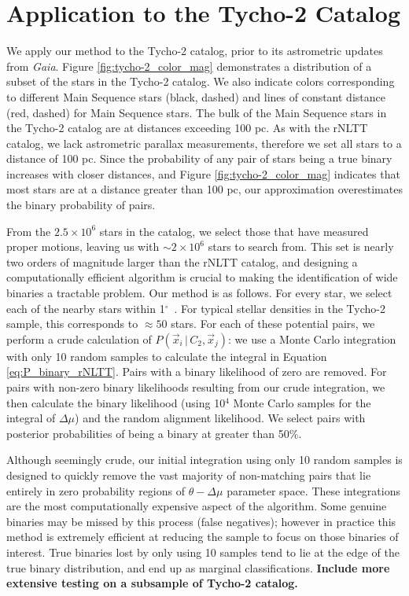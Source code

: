 \documentclass[usenatbib]{mnras}
\newcommand{\given}{\,|\,}
\newcommand{\degree}{\ifmmode {^\circ}\else$^\circ$\ \fi}
\begin{document}
\section{Application to the Tycho-2 Catalog}

We apply our method to the Tycho-2 catalog, prior to its astrometric updates from {\it Gaia}. Figure \ref{fig:tycho-2_color_mag} demonstrates a distribution of a subset of the stars in the Tycho-2 catalog. We also indicate colors corresponding to different Main Sequence stars (black, dashed) and lines of constant distance (red, dashed) for Main Sequence stars. The bulk of the Main Sequence stars in the Tycho-2 catalog are at distances exceeding 100 pc. As with the rNLTT catalog, we lack astrometric parallax measurements, therefore we set all stars to a distance of 100 pc. Since the probability of any pair of stars being a true binary increases with closer distances, and Figure \ref{fig:tycho-2_color_mag} indicates that most stars are at a distance greater than 100 pc, our approximation overestimates the binary probability of pairs.


From the $2.5\times10^6$ stars in the catalog, we select those that have measured proper motions, leaving us with $\sim2\times10^6$ stars to search from. This set is nearly two orders of magnitude larger than the rNLTT catalog, and designing a computationally efficient algorithm is crucial to making the identification of wide binaries a tractable problem. Our method is as follows. For every star, we select each of the nearby stars within 1\degree. For typical stellar densities in the Tycho-2 sample, this corresponds to $\approx50$ stars. For each of these potential pairs, we perform a crude calculation of $P(\vec{x}_i \given C_2, \vec{x}_j)$: we use a Monte Carlo integration with only 10 random samples to calculate the integral in Equation \ref{eq:P_binary_rNLTT}. Pairs with a binary likelihood of zero are removed. For pairs with non-zero binary likelihoods resulting from our crude integration, we then calculate the binary likelihood (using 10$^4$ Monte Carlo samples for the integral of $\Delta \mu$) and the random alignment likelihood. We select pairs with posterior probabilities of being a binary at greater than 50\%.


Although seemingly crude, our initial integration using only 10 random samples is designed to quickly remove the vast majority of non-matching pairs that lie entirely in zero probability regions of $\theta-\Delta \mu$ parameter space. These integrations are the most computationally expensive aspect of the algorithm. Some genuine binaries may be missed by this process (false negatives); however in practice this method is extremely efficient at reducing the sample to focus on those binaries of interest. True binaries lost by only using 10 samples tend to lie at the edge of the true binary distribution, and end up as marginal classifications. {\bf Include more extensive testing on a subsample of Tycho-2 catalog.}
\end{document}
